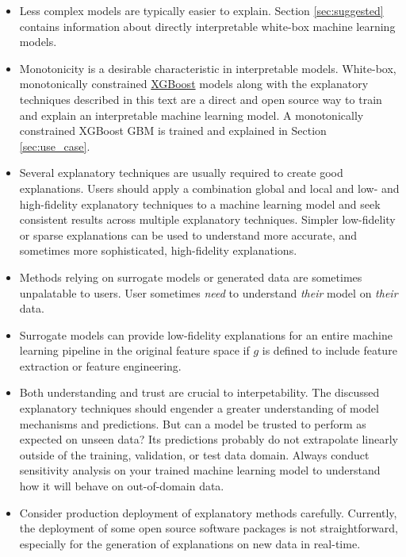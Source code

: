 \documentclass[11pt]{asaproc}
\begin{document}
\begin{itemize}	
	
	\item Less complex models are typically easier to explain. Section \ref{sec:suggested} contains information about directly interpretable white-box machine learning models.
	
	\item Monotonicity is a desirable characteristic in interpretable models. White-box, monotonically constrained \href{https://github.com/dmlc/xgboost}{XGBoost} models along with the explanatory techniques described in this text are a direct and open source way to train and explain an interpretable machine learning model. A monotonically constrained XGBoost GBM is trained and explained in Section \ref{sec:use_case}.
	
	\item Several explanatory techniques are usually required to create good explanations. Users should apply a combination global and local and low- and high-fidelity explanatory techniques to a machine learning model and seek consistent results across multiple explanatory techniques. Simpler low-fidelity or sparse explanations can be used to understand more accurate, and sometimes more sophisticated, high-fidelity explanations.  

	\item Methods relying on surrogate models or generated data are sometimes unpalatable to users. User sometimes \textit{need} to understand \textit{their} model on \textit{their} data.
	
	\item Surrogate models can provide low-fidelity explanations for an entire machine learning pipeline in the original feature space if $g$ is defined to include feature extraction or feature engineering.
	
	\item Both understanding and trust are crucial to interpetability. The discussed explanatory techniques should engender a greater understanding of model mechanisms and predictions. But can a model be trusted to perform as expected on unseen data? Its predictions probably do not extrapolate linearly outside of the training, validation, or test data domain. Always conduct sensitivity analysis on your trained machine learning model to understand how it will behave on out-of-domain data.
	
	\item Consider production deployment of explanatory methods carefully. Currently, the deployment of some open source software packages is not straightforward, especially for the generation of explanations on new data in real-time.
	
\end{itemize}
\end{document}
